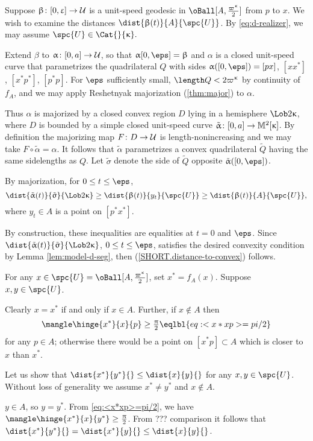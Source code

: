 Suppose  $\beta\:[0,\eps]\to\spc{U}$ is a unit-speed geodesic  in $\oBall[A,\tfrac{\varpi\kappa}{2}]$ from $p$ to $x$.  
We wish to examine the distances $\dist{\beta (t)}{ A}{\spc{U}}$.
By \ref{eq:d-realizer}, we may assume $\spc{U}\in\Cat{}{\kappa}.$

Extend $\beta$ to $\alpha\:[0,a]\to\spc{U}$, so that $\alpha[0,\eps]=\beta$  and $\alpha$  is a closed unit-speed curve that parametrizes 
the  quadrilateral $Q$ with sides   $\alpha([0,\eps]) =[px]$, $[xx^*]$, $[x^* p^*]$, $[p^*p]$.
 For $\eps$ sufficiently small, $\length Q < 2\varpi\kappa$ by continuity of $f_A$, and we may  apply Reshetnyak majorization (\ref{thm:major}) to  $\alpha$.  

Thus $\alpha$ is majorized by a closed convex region $D$  lying in a hemisphere $\Lob2\kappa$, where $D$ is bounded by a simple closed unit-speed curve $\tilde\alpha\:[0,a]\to\Lob2\kappa$.  By definition the majorizing map $F\:D\to \spc{U}$ is length-nonincreasing and  we may take $F\circ\tilde\alpha=\alpha$. It follows that  $\tilde\alpha$ parametrizes a convex quadrilateral $\tilde Q$ having  the same sidelengths as $Q$.  Let $\tilde\sigma$ denote the side of $\tilde Q$ opposite $\tilde\alpha([0,\eps])$.

By majorization, for $0\le t\le\eps$,
$$\dist{\tilde\alpha (t)}{ \tilde\sigma}{\Lob2\kappa}\ge  \dist{\beta (t)}{ y_t}{\spc{U}}\ge \dist{\beta (t)}{ A}{\spc{U}},$$
 where $y_t\in A$ is a point on $[p^* x^*]$.  


By construction, these inequalities are equalities  at
$t=0$ and $\eps$. 
Since $\dist{\tilde\alpha (t)}{ \tilde\sigma}{\Lob2\kappa}$, $0\le t\le \eps$, satisfies the desired convexity condition by Lemma \ref{lem:model-d-seg},
then
(\ref{SHORT.distance-to-convex}) follows.\qeds

For any $x\in \spc{U}=\oBall[A,\tfrac{\varpi\kappa}{2}]$, set  $x^*=f_A( x )$. 
Suppose  $x,y\in\spc{U}$.

Clearly $x=x^*$ if and only if $x\in A$.
Further, if $x\notin A$ then 
\[\mangle\hinge{x^*}{x}{p}\ge\tfrac\pi2\eqlbl{eq:<x*xp>=pi/2}\] 
for any $p\in A$;
otherwise there would be a point on $[x^*p]\subset A$ which is closer to $x$ than $x^*$.

Let us show that $\dist{x^*}{y^*}{}\le\dist{x}{y}{}$ for any $x,y\in \spc{U}$.
Without loss of generality we assume $x^*\not=y^*$ and $x\notin A$.

 $y\in A$, so $y=y^*$.
From \ref{eq:<x*xp>=pi/2}, we have $\mangle\hinge{x^*}{x}{y^*}\ge\tfrac\pi2$.
From ??? comparison it follows that $\dist{x^*}{y^*}{}=\dist{x^*}{y}{}\le \dist{x}{y}{}$.

